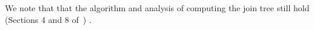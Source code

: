 \documentclass[11pt]{article}
\theoremstyle{definition}
\begin{document}
% 
% 
% 

We note that that the algorithm and analysis of computing the join tree still hold (Sections 4 and 8 of~\cite{rs-17}) .



\end{document}
